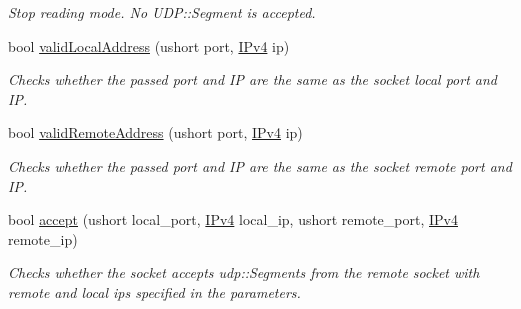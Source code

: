 \begin{DoxyCompactItemize}
\begin{DoxyCompactList}\small\item\em Stop reading mode. No U\+D\+P\+::\+Segment is accepted. \end{DoxyCompactList}\item 
bool \hyperlink{structudp_1_1Socket_a689917ee204053203b09b7c74c872186}{valid\+Local\+Address} (ushort port, \hyperlink{structIPv4}{I\+Pv4} ip)
\begin{DoxyCompactList}\small\item\em Checks whether the passed port and IP are the same as the socket local port and IP. \end{DoxyCompactList}\item 
bool \hyperlink{structudp_1_1Socket_a15a198ff05352aecfb66c27956429b4c}{valid\+Remote\+Address} (ushort port, \hyperlink{structIPv4}{I\+Pv4} ip)
\begin{DoxyCompactList}\small\item\em Checks whether the passed port and IP are the same as the socket remote port and IP. \end{DoxyCompactList}\item 
bool \hyperlink{structudp_1_1Socket_ae0adf9be402d19720ad59dfccd57fb99}{accept} (ushort local\+\_\+port, \hyperlink{structIPv4}{I\+Pv4} local\+\_\+ip, ushort remote\+\_\+port, \hyperlink{structIPv4}{I\+Pv4} remote\+\_\+ip)
\begin{DoxyCompactList}\small\item\em Checks whether the socket accepts udp\+::\+Segments from the remote socket with remote and local ips specified in the parameters. \end{DoxyCompactList}\end{DoxyCompactItemize}
